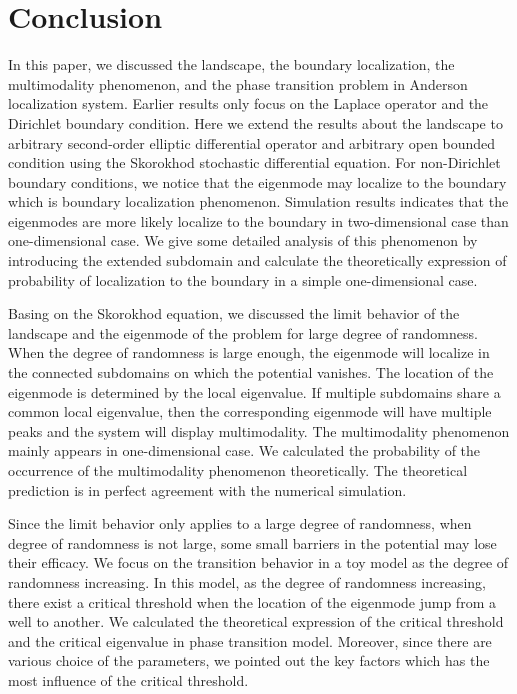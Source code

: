 \documentclass[a4paper,11pt]{article}
\begin{document}
\section{Conclusion}

In this paper, we discussed the landscape, the boundary localization, the multimodality phenomenon, and the phase transition problem in Anderson localization system. Earlier results only focus on the Laplace operator and the Dirichlet boundary condition. Here we extend the results about the landscape to arbitrary second-order elliptic differential operator and arbitrary open bounded condition using the Skorokhod stochastic differential equation. For non-Dirichlet boundary conditions, we notice that the eigenmode may localize to the boundary which is boundary localization phenomenon. Simulation results indicates that the eigenmodes are more likely localize to the boundary in two-dimensional case than one-dimensional case. We give some detailed analysis of this phenomenon by introducing the extended subdomain and calculate the theoretically expression of probability of localization to the boundary in a simple one-dimensional case.

Basing on the Skorokhod equation, we discussed the limit behavior of the landscape and the eigenmode of the problem for large degree of randomness. When the degree of randomness is large enough, the eigenmode will localize in the connected subdomains on which the potential vanishes. The location of the eigenmode is determined by the local eigenvalue. If multiple subdomains share a common local eigenvalue, then the corresponding eigenmode will have multiple peaks and the system will display multimodality. The multimodality phenomenon mainly appears in one-dimensional case. We calculated the probability of the occurrence of the multimodality phenomenon theoretically. The theoretical prediction is in perfect agreement with the numerical simulation.

Since the limit behavior only applies to a large degree of randomness, when degree of randomness is not large, some small barriers in the potential may lose their efficacy. We focus on the transition behavior in a toy model as the degree of randomness increasing. In this model, as the degree of randomness increasing, there exist a critical threshold when the location of the eigenmode jump from a well to another. We calculated the theoretical expression of the critical threshold and the critical eigenvalue in phase transition model. Moreover, since there are various choice of the parameters, we pointed out the key factors which has the most influence of the critical threshold.
\end{document}
